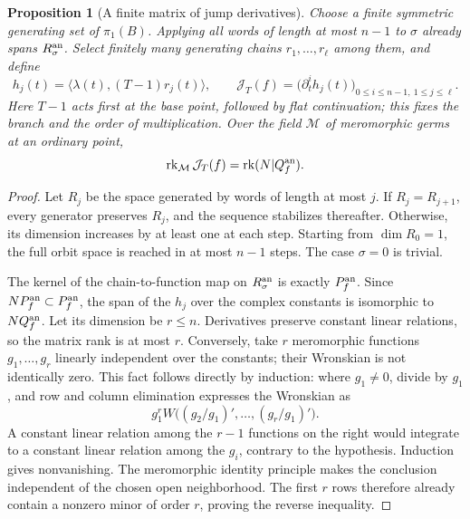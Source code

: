 \documentclass[11pt,a4paper,oneside]{article}
\theoremstyle{plain}
\newtheorem{proposition}[theorem]{Proposition}
\theoremstyle{definition}
\theoremstyle{remark}
\numberwithin{equation}{section}
\begin{document}
\begin{proposition}[A finite matrix of jump derivatives]\label{unified:prop:jumpjet}
Choose a finite symmetric generating set of $\pi_1(B)$. Applying all words of length at most $n-1$ to $\sigma$
already spans $R_\sigma^{\rm an}$. Select finitely many generating chains $r_1,\ldots,r_\ell$ among them, and define
\[
 h_j(t)=\langle\lambda(t),(T-1)r_j(t)\rangle,\qquad
 \mathcal J_T(f)=\bigl(\partial_t^i h_j(t)\bigr)_{
                              0\leq i\leq n-1,\ 1\leq j\leq\ell}.
\]
Here $T-1$ acts first at the base point, followed by flat continuation; this fixes the branch and the order of multiplication.
Over the field $\mathcal M$ of meromorphic germs at an ordinary point,
\begin{equation}\label{unified:eq:jumpjetrank}
 \operatorname{rk}_{\mathcal M}\mathcal J_T(f)=\operatorname{rk}(N|Q_f^{\rm an}).
\end{equation}
\end{proposition}
\begin{proof}
Let $R_j$ be the space generated by words of length at most $j$. If $R_j=R_{j+1}$,
every generator preserves $R_j$, and the sequence stabilizes thereafter. Otherwise, its dimension increases by at least one at each step.
Starting from $\dim R_0=1$, the full orbit space is reached in at most $n-1$ steps.
The case $\sigma=0$ is trivial.

The kernel of the chain-to-function map on $R_\sigma^{\rm an}$ is exactly $P_f^{\rm an}$.
Since $NP_f^{\rm an}\subset P_f^{\rm an}$, the span of the $h_j$ over the complex constants
is isomorphic to $NQ_f^{\rm an}$. Let its dimension be $r\leq n$.
Derivatives preserve constant linear relations, so the matrix rank is at most $r$.
Conversely, take $r$ meromorphic functions $g_1,\ldots,g_r$ linearly independent over the constants;
their Wronskian is not identically zero. This fact follows directly by induction: where $g_1\ne0$, divide by $g_1$,
and row and column elimination expresses the Wronskian as
\[
 g_1^r W\bigl((g_2/g_1)',\ldots,(g_r/g_1)'\bigr).
\]
A constant linear relation among the $r-1$ functions on the right would integrate to a constant linear relation among the $g_i$,
contrary to the hypothesis. Induction gives nonvanishing. The meromorphic identity principle makes the conclusion independent of the chosen open neighborhood.
The first $r$ rows therefore already contain a nonzero minor of order $r$, proving the reverse inequality.
\end{proof}
\end{document}
